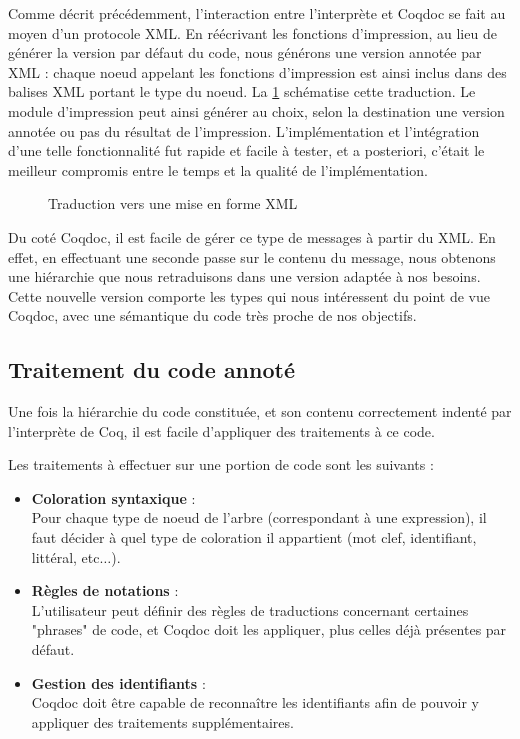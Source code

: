\documentclass[a4paper, 11pt]{report}
\begin{document}
    Comme décrit précédemment, l'interaction entre l'interprète et Coqdoc se
    fait au moyen d'un protocole XML. En réécrivant les fonctions d'impression,
    au lieu de générer la version par défaut du code, nous générons une version
    annotée par XML : chaque noeud appelant les fonctions d'impression est
    ainsi inclus dans des balises XML portant le type du noeud. La \cref{xml} schématise
    cette traduction. Le module d'impression peut ainsi générer au choix,
    selon la destination une version annotée ou pas du résultat de
    l'impression. L'implémentation et l'intégration d'une telle fonctionnalité
    fut rapide et facile à tester, et a posteriori, c'était le meilleur compromis
    entre le temps et la qualité de l'implémentation.
    
    \begin{figure}
    
    \caption{Traduction vers une mise en forme XML\label{xml}}
    \end{figure}
    \clearpage

    Du coté Coqdoc, il est facile de gérer ce type de messages à partir du XML.
    En effet, en effectuant une seconde passe sur le contenu du message, nous
    obtenons une hiérarchie que nous retraduisons dans une version adaptée à
    nos besoins. Cette nouvelle version comporte les types qui nous intéressent
    du point de vue Coqdoc, avec une sémantique du code très proche de nos
    objectifs.

    \subsection{Traitement du code annoté}
    Une fois la hiérarchie du code constituée, et son contenu correctement
    indenté par l'interprète de Coq, il est facile d'appliquer des traitements
    à ce code.

    Les traitements à effectuer sur une portion de code sont les suivants :
    \begin{itemize}
      \item \textbf{Coloration syntaxique} : \\
        Pour chaque type de noeud de l'arbre (correspondant à une expression),
        il faut décider à quel type de coloration il appartient (mot clef,
        identifiant, littéral, etc$\ldots$).
      \item \textbf{Règles de notations} : \\
        L'utilisateur peut définir des règles de traductions concernant
        certaines "phrases" de code, et Coqdoc doit les appliquer, plus celles
        déjà présentes par défaut.
      \item \textbf{Gestion des identifiants} : \\
        Coqdoc doit être capable de reconnaître les identifiants afin de pouvoir
        y appliquer des traitements supplémentaires.
    \end{itemize}
\end{document}
